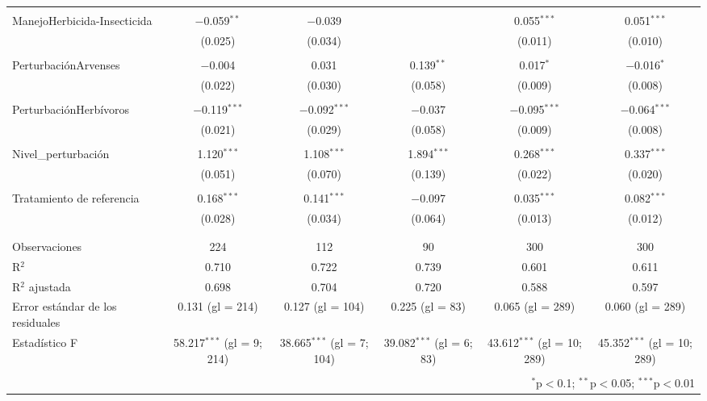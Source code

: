 \documentclass[spanish,11pt]{article}
\begin{document}
\begin{table}[!htbp]
\begin{tabular}{@{\extracolsep{5pt}}lccccc}
  & & & & & \\ 
 ManejoHerbicida-Insecticida & $-$0.059$^{**}$ & $-$0.039 &  & 0.055$^{***}$ & 0.051$^{***}$ \\ 
  & (0.025) & (0.034) &  & (0.011) & (0.010) \\ 
  & & & & & \\ 
 PerturbaciónArvenses & $-$0.004 & 0.031 & 0.139$^{**}$ & 0.017$^{*}$ & $-$0.016$^{*}$ \\ 
  & (0.022) & (0.030) & (0.058) & (0.009) & (0.008) \\ 
  & & & & & \\ 
 PerturbaciónHerbívoros & $-$0.119$^{***}$ & $-$0.092$^{***}$ & $-$0.037 & $-$0.095$^{***}$ & $-$0.064$^{***}$ \\ 
  & (0.021) & (0.029) & (0.058) & (0.009) & (0.008) \\ 
  & & & & & \\ 
 Nivel\_perturbación & 1.120$^{***}$ & 1.108$^{***}$ & 1.894$^{***}$ & 0.268$^{***}$ & 0.337$^{***}$ \\ 
  & (0.051) & (0.070) & (0.139) & (0.022) & (0.020) \\ 
  & & & & & \\ 
 Tratamiento de referencia & 0.168$^{***}$ & 0.141$^{***}$ & $-$0.097 & 0.035$^{***}$ & 0.082$^{***}$ \\ 
  & (0.028) & (0.034) & (0.064) & (0.013) & (0.012) \\ 
  & & & & & \\ 
\hline \\[-1.8ex] 
Observaciones & 224 & 112 & 90 & 300 & 300 \\ 
R$^{2}$ & 0.710 & 0.722 & 0.739 & 0.601 & 0.611 \\ 
R$^{2}$ ajustada & 0.698 & 0.704 & 0.720 & 0.588 & 0.597 \\ 
Error estándar de los residuales & 0.131 (gl = 214) & 0.127 (gl = 104) & 0.225 (gl = 83) & 0.065 (gl = 289) & 0.060 (gl = 289) \\ 
Estadístico F & 58.217$^{***}$ (gl = 9; 214) & 38.665$^{***}$ (gl = 7; 104) & 39.082$^{***}$ (gl = 6; 83) & 43.612$^{***}$ (gl = 10; 289) & 45.352$^{***}$ (gl = 10; 289) \\ 
\hline 
\hline \\[-1.8ex] 
\multicolumn{6}{r}{$^{*}$p$<$0.1; $^{**}$p$<$0.05; $^{***}$p$<$0.01} \\ 
\end{tabular} 
\end{table} 
\end{document}
